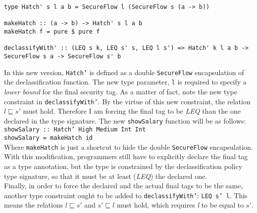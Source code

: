 \begin{lstlisting}[caption={A more strict Hatch version}, label={lst:newhatch}, breaklines=true]
type Hatch' s l a b = SecureFlow l (SecureFlow s (a -> b))

makeHatch :: (a -> b) -> Hatch' s l a b
makeHatch f = pure $ pure f

declassifyWith' :: (LEQ s k, LEQ s' s, LEQ l s') => Hatch' k l a b -> SecureFlow s a -> SecureFlow s' b
\end{lstlisting}
In this new version, \texttt{Hatch'} is defined as a double \texttt{SecureFlow} encapsulation of the declassification function. The new type parameter, \texttt{l} is required to specify a \textit{lower bound} for the final security tag. As a matter of fact, note the new type constraint in \texttt{declassifyWith'}. By the virtue of this new constraint, the relation $l \sqsubseteq s'$ must hold. Therefore I am forcing the final tag to be \textit{LEQ} than the one declared in the type signature. The new \texttt{showSalary} function will be as follows: \\
\texttt{showSalary :: Hatch' High Medium Int Int \\showSalary = makeHatch id} \\
Where \texttt{makeHatch} is just a shortcut to hide the double \texttt{SecureFlow} encapsulation. \\
With this modification, programmers still have to explicitly declare the final tag as a type annotation, but the type is constrained by the declassification policy type signature, so that it must be at least (\textit{LEQ}) the declared one. \\
Finally, in order to force the declared and the actual final tags to be the same, another type constraint ought to be added to \texttt{declassifyWith'}: \texttt{LEQ s' l}. This means the relations $l \sqsubseteq s'$ and $s' \sqsubseteq l$ must hold, which requires \textit{l} to be equal to $s'$.